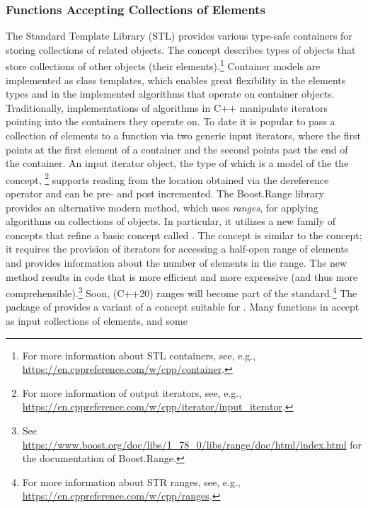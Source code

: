 \subsubsection{Functions Accepting Collections of Elements}
\label{sec:code:input}
The Standard Template Library (STL) provides various type-safe
containers for storing collections of related objects. The
 concept describes types of objects that store
collections of other objects (their elements).\footnote{For more
  information about STL containers, see, e.g.,
  \url{https://en.cppreference.com/w/cpp/container}.} Container models
are implemented as class templates, which enables great flexibility in
the elements types and in the implemented algorithms that operate on
container objects. Traditionally, implementations of algorithms in C++
manipulate iterators pointing into the containers they operate on. To
date it is popular to pass a collection of elements to a function via
two generic input iterators, where the first points at the first
element of a container and the second points past the end of the
container. An input iterator object, the type of
which is a model of the the  concept,
\footnote{For more information of output iterators, see, e.g.,
  \url{https://en.cppreference.com/w/cpp/iterator/input_iterator}.}
supports reading from the location obtained via the dereference
operator and can be pre- and post incremented.  The Boost.Range
library provides an alternative modern method, which uses
\emph{ranges}, for applying algorithms on collections of objects. In
particular, it utilizes a new family of concepts that refine a basic
concept called . The  concept
is similar to the  concept; it requires the
provision of iterators for accessing a half-open range of elements and
provides information about the number of elements in the range. The
new method results in code that is more efficient and more expressive
(and thus more comprehensible).\footnote{See
  \url{https://www.boost.org/doc/libs/1_78_0/libs/range/doc/html/index.html}
  for the documentation of Boost.Range.}  Soon, (C++20) ranges will
become part of the standard.\footnote{For more information about STR
  ranges, see, e.g., \url{https://en.cppreference.com/w/cpp/ranges}.}
The \HandlesandCirculatorsPackage{} package of \cgal{} provides a
variant of a  concept suitable for \cgal{}. Many
functions in \cgal{} accept as input collections of elements, and some
